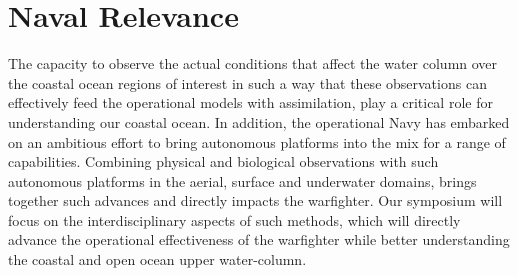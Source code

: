 \section{Naval Relevance}

The capacity to observe the actual conditions that affect the water
column over the coastal ocean regions of interest in such a way that
these observations can effectively feed the operational models with
assimilation, play a critical role for understanding our coastal
ocean. In addition, the operational Navy has embarked on an ambitious
effort to bring autonomous platforms into the mix for a range of
capabilities. Combining physical and biological observations with such
autonomous platforms in the aerial, surface and underwater domains,
brings together such advances and directly impacts the warfighter. Our
symposium will focus on the interdisciplinary aspects of such methods,
which will directly advance the operational effectiveness of the
warfighter while better understanding the coastal and open ocean upper
water-column.
